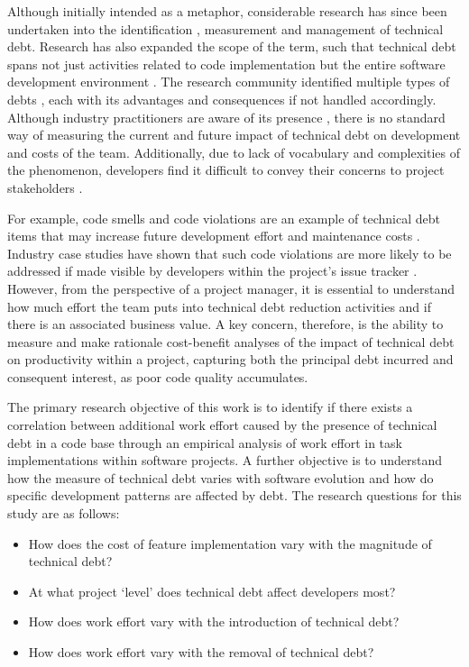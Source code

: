 \documentclass{mpaper}
\begin{document}
Although initially intended as a metaphor, considerable research has since been
undertaken into the identification \cite{Lim2012}, measurement
\cite{Fontana2016} and management \cite{Codabux2013} of technical debt. Research
has also expanded the scope of the term, such that technical debt spans not just
activities related to code implementation but the entire software development
environment \cite{Power2013}. The research community identified multiple types
of debts \cite{Li2015}, each with its advantages and consequences if not handled
accordingly. Although industry practitioners are aware of its presence
\cite{Codabux2013} \cite{Lim2012}, there is no standard way of measuring the
current and future impact of technical debt on development and costs of the
team. Additionally, due to lack of vocabulary and complexities of the
phenomenon, developers find it difficult to convey their concerns to project
stakeholders \cite{Kruchten2012}.
 
For example, code smells and code violations are an example of technical debt
items that may increase future development effort and maintenance costs
\cite{Fowler1999}. Industry case studies have shown that such code violations
are more likely to be addressed if made visible by developers within the
project's issue tracker \cite{Lim2012}. However, from the perspective of a
project manager, it is essential to understand how much effort the team puts
into technical debt reduction activities and if there is an associated business
value. A key concern, therefore, is the ability to measure and make rationale
cost-benefit analyses of the impact of technical debt on productivity within a
project, capturing both the principal debt incurred and consequent interest, as
poor code quality accumulates.

The primary research objective of this work is to identify if there exists a
correlation between additional work effort caused by the presence of technical
debt in a code base through an empirical analysis of work effort in task
implementations within software projects. A further objective is to understand
how the measure of technical debt varies with software evolution and how do
specific development patterns are affected by debt. The research questions for
this study are as follows:

\begin{itemize}
	\item How does the cost of feature implementation vary with the magnitude of
	      technical debt?
	\item At what project `level' does technical debt affect developers most?
  \item How does work effort vary with the introduction of technical debt? 
  \item How does work effort vary with the removal of technical debt?
\end{itemize}
\end{document}
